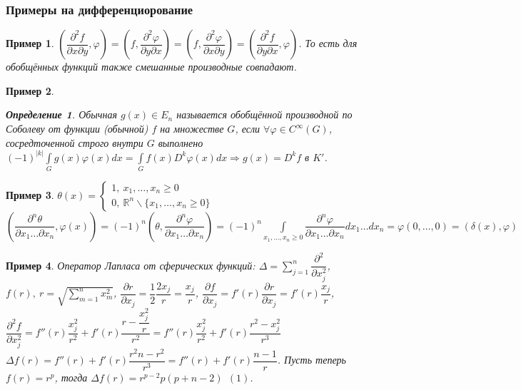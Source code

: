 \documentclass[9pt, a4paper]{article}
\newtheorem*{definition}{Определение}
\newtheorem*{sample}{Пример}
\begin{document}
		\subsubsection*{Примеры на дифференциорование}
			\begin{sample}
				$(\dfrac{\partial^2f}{\partial x \partial y}, \varphi) = (f,\dfrac{\partial^2\varphi}{\partial y \partial x})= (f,\dfrac{\partial^2\varphi}{\partial x \partial y}) = (\dfrac{\partial^2f}{\partial y \partial x}, \varphi)$. То есть для обобщённых функций также смешанные производные совпадают.
			\end{sample}
			\begin{sample}
				\begin{definition}
					Обычная $g(x) \in E_n$ называется обобщённой производной по Соболеву от функции (обычной) $f$ на множестве $G$, если $\forall \varphi \in C^\infty(G)$, сосредточенной строго внутри $G$ выполнено $(-1)^{|k|} \int\limits_G g(x)\varphi(x) dx = \int\limits_G f(x) D^k \varphi(x) dx \Rightarrow g(x) = D^k f$ в $K'$.
				\end{definition}
			\end{sample}
			\begin{sample}
				$\theta(x) = \begin{cases}
					1, \ x_1, \dots, x_n \geq 0 \\
					0, \ \mathbb{R}^n \backslash \{x_1, \dots, x_n \geq 0\}
				\end{cases}$\newline
				$(\dfrac{\partial^n \theta}{\partial x_1 \dots \partial x_n}, \varphi(x)) = (-1)^n (\theta, \dfrac{\partial^n \varphi}{\partial x_1 \dots \partial x_n}) = (-1)^n \int\limits_{x_1, \dots, x_n \geq 0} \dfrac{\partial^n \varphi}{\partial x_1 \dots \partial x_n} dx_1 \dots dx_n = \varphi(0,\dots, 0) = (\delta(x), \varphi)$
			\end{sample}
			\begin{sample}
				Оператор Лапласа от сферических функций: \newline
				$\Delta = \sum\limits_{j=1}^n \dfrac{\partial^2}{\partial x_j^2}$, $f(r), \ r = \sqrt{\sum\limits_{m=1}^n x_m^2}$, $\dfrac{\partial r}{\partial x_j} = \dfrac12 \dfrac{2x_j}{r} = \dfrac{x_j}{r}$, $\dfrac{\partial f}{\partial x_j} = f'(r) \dfrac{\partial r}{\partial x_j} = f'(r) \dfrac{x_j}{r}$, $\dfrac{\partial^2 f}{\partial x_j^2} = f''(r) \dfrac{x_j^2}{r^2} + f'(r) \dfrac{r - \dfrac{x_j^2}{r}}{r^2} = f''(r) \dfrac{x_j^2}{r^2} + f'(r) \dfrac{r^2 - x_j^2}{r^3}$\newline
				$\Delta f(r) = f''(r) + f'(r) \dfrac{r^2n - r^2}{r^3} = f''(r) + f'(r) \dfrac{n-1}{r}$. Пусть теперь $f(r) = r^p$, тогда $\Delta f(r) = r^{p-2} p(p+n -2) \ \ (1)$.
			\end{sample}
\end{document}
